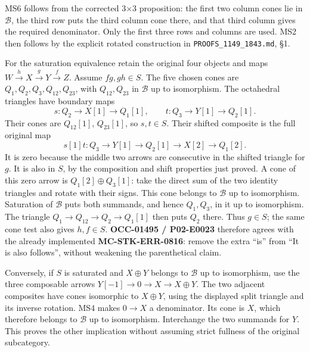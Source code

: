 \documentclass[11pt]{article}
\begin{document}
MS6 follows from the corrected 3×3 proposition:\allowbreak{} the first two column cones lie in \(\mathcal B\),\allowbreak{} the third row puts the third column cone there,\allowbreak{} and that third column gives the required denominator. Only the first three rows and columns are used. MS2 then follows by the explicit rotated construction in \texttt{PROOFS\_\allowbreak{}1149\_\allowbreak{}1843.\allowbreak{}md},\allowbreak{} §1.

For the saturation equivalence retain the original four objects and maps \(W\xrightarrow hX\xrightarrow gY\xrightarrow fZ\). Assume \(fg,gh\in S\). The five chosen cones are \(Q_1,Q_2,Q_3,Q_{12},Q_{23}\),\allowbreak{} with \(Q_{12},Q_{23}\) in \(\mathcal B\) up to isomorphism. The octahedral triangles have boundary maps \[
s:Q_2\longrightarrow X[1]\longrightarrow Q_1[1],\qquad
t:Q_3\longrightarrow Y[1]\longrightarrow Q_2[1].
\] Their cones are \(Q_{12}[1]\),\allowbreak{} \(Q_{23}[1]\),\allowbreak{} so \(s,t\in S\). Their shifted composite is the full original map \[
s[1]t:Q_3\longrightarrow Y[1]\longrightarrow Q_2[1]
\longrightarrow X[2]\longrightarrow Q_1[2].
\] It is zero because the middle two arrows are consecutive in the shifted triangle for \(g\). It is also in \(S\),\allowbreak{} by the composition and shift properties just proved. A cone of this zero arrow is \(Q_1[2]\oplus Q_3[1]\):\allowbreak{} take the direct sum of the two identity triangles and rotate with their signs. This cone belongs to \(\mathcal B\) up to isomorphism. Saturation of \(\mathcal B\) puts both summands,\allowbreak{} and hence \(Q_1,Q_3\),\allowbreak{} in it up to isomorphism. The triangle \(Q_1\to Q_{12}\to Q_2\to Q_1[1]\) then puts \(Q_2\) there. Thus \(g\in S\); the same cone test also gives \(h,f\in S\). \textbf{OCC-01495 /\allowbreak{} P02-E0023} therefore agrees with the already implemented \textbf{MC-STK-ERR-0816}:\allowbreak{} remove the extra ``is'' from ``It is also follows”,\allowbreak{} without weakening the parenthetical claim.

Conversely,\allowbreak{} if \(S\) is saturated and \(X\oplus Y\) belongs to \(\mathcal B\) up to isomorphism,\allowbreak{} use the three composable arrows \(Y[-1]\to0\to X\to X\oplus Y\). The two adjacent composites have cones isomorphic to \(X\oplus Y\),\allowbreak{} using the displayed split triangle and its inverse rotation. MS4 makes \(0\to X\) a denominator. Its cone is \(X\),\allowbreak{} which therefore belongs to \(\mathcal B\) up to isomorphism. Interchange the two summands for \(Y\). This proves the other implication without assuming strict fullness of the original subcategory.
\end{document}
